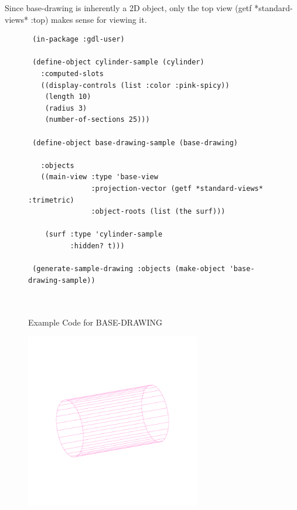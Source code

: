\documentclass [11pt]{book}
\begin{document}
\begin{itemize}
\begin{description}
Since base-drawing is inherently a 2D object, only the top view (getf *standard-views* :top) 
makes sense for viewing it.



\end{description}




\begin{figure}
\begin{lrbox}{\boxedverb}
\begin{minipage}{\linewidth}
{\small

\begin{verbatim}
 (in-package :gdl-user)

 (define-object cylinder-sample (cylinder)
   :computed-slots
   ((display-controls (list :color :pink-spicy))
    (length 10)
    (radius 3)
    (number-of-sections 25)))

 (define-object base-drawing-sample (base-drawing)
  
   :objects
   ((main-view :type 'base-view
               :projection-vector (getf *standard-views* :trimetric)
               :object-roots (list (the surf)))
 
    (surf :type 'cylinder-sample
          :hidden? t))) 

 (generate-sample-drawing :objects (make-object 'base-drawing-sample))                

 
\end{verbatim}}
\end{minipage}
\end{lrbox}
\fbox{\usebox{\boxedverb}}

\caption{Example Code for BASE-DRAWING}

\label{fig:example-code-BASE-DRAWING}

\end{figure}

\begin{figure}
\begin{center}
\includegraphics[width=3in,height=3in]{../images/example-base-drawing.pdf}
\end{center}


\end{figure}
\end{itemize}
\end{document}
